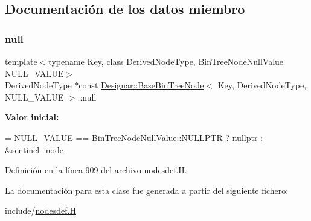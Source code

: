 \subsection{Documentación de los datos miembro}
\mbox{\label{class_designar_1_1_base_bin_tree_node_a0ea0251169acae6e7943ccc54f66472a}} 
\subsubsection{\texorpdfstring{null}{null}}
{\footnotesize\ttfamily template$<$typename Key, class Derived\+Node\+Type, Bin\+Tree\+Node\+Null\+Value N\+U\+L\+L\+\_\+\+V\+A\+L\+UE$>$ \\
Derived\+Node\+Type $\ast$const \hyperlink{class_designar_1_1_base_bin_tree_node}{Designar\+::\+Base\+Bin\+Tree\+Node}$<$ Key, Derived\+Node\+Type, N\+U\+L\+L\+\_\+\+V\+A\+L\+UE $>$\+::null\hspace{0.3cm}{\ttfamily [static]}}

{\bfseries Valor inicial\+:}
\begin{DoxyCode}
=
    NULL\_VALUE == \hyperlink{namespace_designar_adc51778fc9415de368881abd254cca7cabf31abdbb1a298903e3a7f0edd0dcaf9}{BinTreeNodeNullValue::NULLPTR} ? nullptr : &sentinel\_node
\end{DoxyCode}


Definición en la línea 909 del archivo nodesdef.\+H.



La documentación para esta clase fue generada a partir del siguiente fichero\+:\begin{DoxyCompactItemize}
\item 
include/\hyperlink{nodesdef_8_h}{nodesdef.\+H}\end{DoxyCompactItemize}
